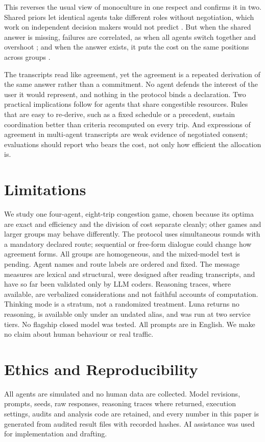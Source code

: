 \documentclass[11pt]{article}
\begin{document}
This reverses the usual view of monoculture in one respect and confirms it in two. Shared priors let identical agents take different roles without negotiation, which work on independent decision makers would not predict \citep{ballestero2026_monoculture}. But when the shared answer is missing, failures are correlated, as when all agents switch together and overshoot \citep{kleinberg2021_monoculture}; and when the answer exists, it puts the cost on the same positions across groups \citep{bommasani2022_picking}.

The transcripts read like agreement, yet the agreement is a repeated derivation of the same answer rather than a commitment. No agent defends the interest of the user it would represent, and nothing in the protocol binds a declaration. Two practical implications follow for agents that share congestible resources. Rules that are easy to re-derive, such as a fixed schedule or a precedent, sustain coordination better than criteria recomputed on every trip. And expressions of agreement in multi-agent transcripts are weak evidence of negotiated consent; evaluations should report who bears the cost, not only how efficient the allocation is.

\section*{Limitations}
We study one four-agent, eight-trip congestion game, chosen because its optima are exact and efficiency and the division of cost separate cleanly; other games and larger groups may behave differently. The protocol uses simultaneous rounds with a mandatory declared route; sequential or free-form dialogue could change how agreement forms. All groups are homogeneous, and the mixed-model test is pending. Agent names and route labels are ordered and fixed. The message measures are lexical and structural, were designed after reading transcripts, and have so far been validated only by LLM coders. Reasoning traces, where available, are verbalized considerations and not faithful accounts of computation. Thinking mode is a stratum, not a randomized treatment. Luna returns no reasoning, is available only under an undated alias, and was run at two service tiers. No flagship closed model was tested. All prompts are in English. We make no claim about human behaviour or real traffic.

\section*{Ethics and Reproducibility}
All agents are simulated and no human data are collected. Model revisions, prompts, seeds, raw responses, reasoning traces where returned, execution settings, audits and analysis code are retained, and every number in this paper is generated from audited result files with recorded hashes. AI assistance was used for implementation and drafting.
\end{document}
